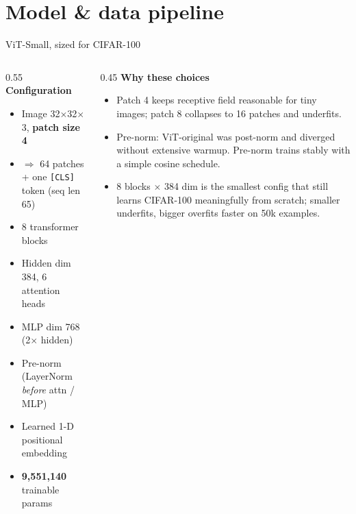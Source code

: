 \documentclass[aspectratio=169,10pt]{beamer}
\begin{document}
\section{Model \& data pipeline}

\begin{frame}{ViT-Small, sized for CIFAR-100}
  \begin{columns}[T,onlytextwidth]
    \begin{column}{0.55\textwidth}
      \textbf{Configuration}
      \begin{itemize}
        \item Image 32$\times$32$\times$3, \textbf{patch size 4}
        \item $\Rightarrow$ 64 patches + one \texttt{[CLS]} token (seq len 65)
        \item 8 transformer blocks
        \item Hidden dim 384, 6 attention heads
        \item MLP dim 768 (2$\times$ hidden)
        \item Pre-norm (LayerNorm \emph{before} attn / MLP)
        \item Learned 1-D positional embedding
        \item \textbf{9{,}551{,}140} trainable params
      \end{itemize}
    \end{column}
    \begin{column}{0.45\textwidth}
      \textbf{Why these choices}
      \begin{itemize}
        \item Patch 4 keeps receptive field reasonable for tiny images; patch 8 collapses
              to 16 patches and underfits.
        \item Pre-norm: ViT-original was post-norm and diverged without extensive warmup.
              Pre-norm trains stably with a simple cosine schedule.
        \item 8 blocks $\times$ 384 dim is the smallest config that still learns
              CIFAR-100 meaningfully from scratch; smaller underfits, bigger overfits
              faster on 50k examples.
      \end{itemize}
    \end{column}
  \end{columns}
\end{frame}
\end{document}
